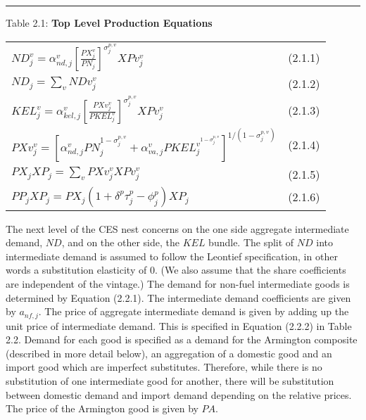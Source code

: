 \documentclass[12pt]{article}
\begin{document}
\noindent\rule{\linewidth}{0.4pt}
\begin{center}
\begin{large}

{\centering Table 2.1: \textbf{Top Level Production Equations} \par}

\begin{tabular}{>{\raggedright}p{} l}

    $N\!D_j^v=\alpha^v_{nd,j}\left[\frac{P\!X_j^v}{P\!N_j}\right]^{\sigma^{p,v}_j} X\!Pv^v_j$ & (2.1.1) \\[10pt]
    $N\!D_j=\displaystyle \sum_{v} N\!Dv_j^v$ & (2.1.2) \\
    $K\!EL^v_j = \alpha^v_{kel,j}\left[\frac{PXv^v_j}{PKEL^v_j}\right]^{\sigma^{p,v}_j} X\!Pv^v_j$ & (2.1.3) \\[10pt]
    {\normalsize $PXv^v_j = \left[\alpha^v_{nd,j}PN_j^{1-{\sigma_j^{p,v}}}+\alpha^v_{va,j} PKEL_j^{v^{1-{\sigma_j^{p,v}}}}\right]^{1/({1-\sigma_j^{p,v}})}$} & (2.1.4) \\[10pt]
    $P\!X_j X\!P_j = \displaystyle \sum_v P\!Xv^v_j X\!Pv^v_j$ & (2.1.5) \\[10pt]
    $P\!P_j X\!P_j = P\!X_j(1+\delta^p\tau^p_j-\phi^p_j)X\!P_j$ & (2.1.6) \\[10pt]
\hline
\end{tabular}
\end{large}
\end{center}

The next level of the CES nest concerns on the one side aggregate intermediate demand, $N\!D$, and on the other side, the $K\!EL$ bundle. The split of $N\!D$ into intermediate demand is assumed to follow the Leontief specification, in other words a substitution elasticity of 0. (We also assume that the share coefficients are independent of the vintage.) The demand for non-fuel intermediate goods is determined by Equation (2.2.1). The intermediate demand coefficients are given by $a_{nf,j}$. The price of aggregate intermediate demand is given by adding up the unit price of intermediate demand. This is specified in Equation (2.2.2) in Table 2.2. Demand for each good is specified as a demand for the Armington composite (described in more detail below), an aggregation of a domestic good and an import good which are imperfect substitutes. Therefore, while there is no substitution of one intermediate good for another, there will be substitution between domestic demand and import demand depending on the relative prices. The price of the Armington good is given by $P\!A$.
\end{document}
